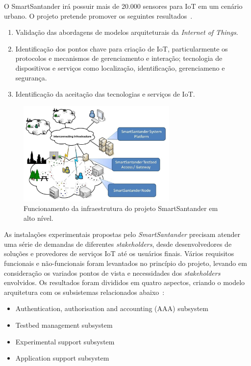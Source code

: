 O SmartSantander irá possuir mais de 20.000 sensores para IoT em um cenário urbano. O projeto pretende promover os
seguintes resultados~\cite{smartsantandersite}.
\begin{enumerate}
\item Validação das abordagens de modelos arquiteturais da \textit{Internet of Things}.
\item Identificação dos pontos chave para criação de IoT, particularmente os protocolos e mecanismos de gerenciamento e
interação; tecnologia de dispositivos e serviços como localização, identificação, gerenciameno e segurança.
\item Identificação da aceitação das tecnologias e serviços de IoT.
\end{enumerate}

\begin{figure}[H]
	\centering
		\includegraphics[width=0.7\textwidth]{fig/smartsantander.jpg}
	\caption{Funcionamento da infraestrutura do projeto SmartSantander em alto nível.}
\end{figure}

As instalações experimentais propostas pelo \textit{SmartSantander} precisam atender uma série de demandas
de diferentes \textit{stakeholders}, desde desenvolvedores de soluções e provedores de serviços IoT até os usuários finais.
Vários requisitos funcionais e não-funcionais foram levantados no princípio do projeto, levando em consideração
os variados pontos de vista e necessidades dos \textit{stakeholders} envolvidos. Os resultados foram divididos em quatro
aspectos, criando o modelo arquitetura com os subsistemas relacionados abaixo~\cite{citeulike:13508566}:
\begin{itemize}
\item Authentication, authorisation and accounting (AAA) subsystem
\item Testbed management subsystem
\item Experimental support subsystem
\item Application support subsystem
\end{itemize}

